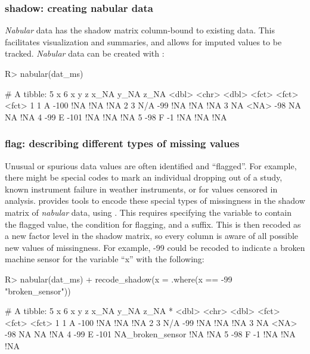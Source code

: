 \documentclass[
]{jss}
\begin{document}
\hypertarget{verbs-nabular}{%
\subsubsection{shadow: creating nabular data}\label{verbs-nabular}}

\emph{Nabular} data has the shadow matrix column-bound to existing data. This facilitates visualization and summaries, and allows for imputed values to be tracked. \emph{Nabular} data can be created with :

\begin{CodeChunk}
\begin{CodeInput}
R> nabular(dat_ms)
\end{CodeInput}
\begin{CodeOutput}
# A tibble: 5 x 6
      x y         z x_NA  y_NA  z_NA 
  <dbl> <chr> <dbl> <fct> <fct> <fct>
1     1 A      -100 !NA   !NA   !NA  
2     3 N/A     -99 !NA   !NA   !NA  
3    NA <NA>    -98 NA    NA    !NA  
4   -99 E      -101 !NA   !NA   !NA  
5   -98 F        -1 !NA   !NA   !NA  
\end{CodeOutput}
\end{CodeChunk}

\hypertarget{verbs-recode}{%
\subsubsection{flag: describing different types of missing values}\label{verbs-recode}}

Unusual or spurious data values are often identified and ``flagged''. For example, there might be special codes to mark an individual dropping out of a study, known instrument failure in weather instruments, or for values censored in analysis.  provides tools to encode these special types of missingness in the shadow matrix of \emph{nabular} data, using . This requires specifying the variable to contain the flagged value, the condition for flagging, and a suffix. This is then recoded as a new factor level in the shadow matrix, so every column is aware of all possible new values of missingness. For example, -99 could be recoded to indicate a broken machine sensor for the variable ``x'' with the following:

\begin{CodeChunk}
\begin{CodeInput}
R> nabular(dat_ms) %
+   recode_shadow(x = .where(x == -99 ~ "broken_sensor"))
\end{CodeInput}
\begin{CodeOutput}
# A tibble: 5 x 6
      x y         z x_NA             y_NA  z_NA 
* <dbl> <chr> <dbl> <fct>            <fct> <fct>
1     1 A      -100 !NA              !NA   !NA  
2     3 N/A     -99 !NA              !NA   !NA  
3    NA <NA>    -98 NA               NA    !NA  
4   -99 E      -101 NA_broken_sensor !NA   !NA  
5   -98 F        -1 !NA              !NA   !NA  
\end{CodeOutput}
\end{CodeChunk}
\end{document}

